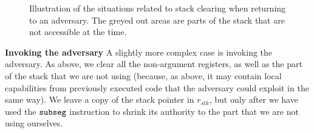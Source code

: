 \documentclass[format=acmsmall, review=true, screen=true]{acmart}
\newcommand{\var}[1]{\mathit{#1}}
\newcommand{\stk}{\var{stk}}
\newcommand{\zinstr}[1]{\mathtt{#1}}
\newcommand{\threeinstr}[4]{
  \ifthenelse{\equal{#2#3#4}{}}
  {\zinstr{#1}}
  {\zinstr{#1} \; #2 \; #3 \; #4}
}
\newcommand{\subseg}[3]{\threeinstr{subseg}{#1}{#2}{#3}}
\begin{document}
\begin{figure}[htb]
\begin{subfigure}{0.333\linewidth}
  \caption{}
  \label{fig:illu-adv-data}
  \end{subfigure}
  \begin{subfigure}{0.333\linewidth}
  \caption{}
  \label{fig:illu-clear-all}
  \end{subfigure}
  \caption{Illustration of the situations related to stack clearing when returning to an adversary.
    The greyed out areas are parts of the stack that are not accessible at the time.}
  \label{fig:ret-adv}
\end{figure}
\textbf{Invoking the adversary} A slightly more complex case is invoking the
adversary. As above, we clear all the non-argument registers, as well as the
part of the stack that we are not using (because, as above, it may contain local
capabilities from previously executed code that the adversary could exploit in
the same way). We leave a copy of the stack pointer in $r_\stk$, but only after
we have used the $\subseg{}{}{}$ instruction to shrink its authority to the part
that we are not using ourselves.
\end{document}
